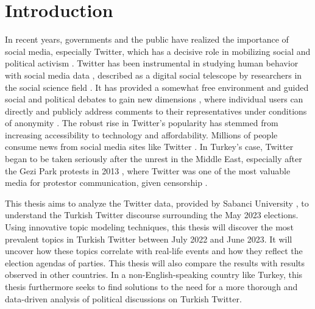 
\chapter{Introduction}\label{chapter:introduction}

In recent years, governments and the public have realized the importance of social media, 
especially Twitter, which has a decisive role in mobilizing social and political activism 
\parencite{uysal_turkeys_twitter_public_diplomacy_2019}. 
Twitter has been instrumental in studying human behavior with social media data 
\parencite{pfeffer_twitter_24_Hours_just_another_day_2023}, 
described as a digital social telescope by researchers in the social science field 
\parencite{mejova_twitter_2015_social_telescope}. 
It has provided a somewhat free environment and guided social and political debates to 
gain new dimensions \parencite{yerlikaya_social_media_manipulation_politics_2020}, 
where individual users can directly and publicly address comments to their representatives under 
conditions of anonymity \parencite{theocharis_twitter_political_incivility_2020}. The robust rise 
in Twitter's popularity has stemmed from increasing accessibility to technology and affordability. 
Millions of people consume news from social media sites like Twitter \parencite{anwar_analyzing_twitter_BERT_QAnon_2021}. 
In Turkey's case, Twitter began to be taken seriously after the unrest in the Middle East, 
especially after the Gezi Park protests in 2013 \parencite{zaharna_uysal_social_media_2016}, 
where Twitter was one of the most valuable media for protestor communication, given censorship 
\parencite{ogan__varol_twitter_gezi_park_2017}.


This thesis aims to analyze the Twitter data, provided by Sabanci University \parencite{secim2023},
to understand the Turkish Twitter discourse surrounding the May 2023 elections. Using innovative
topic modeling techniques, this thesis will discover the most prevalent topics in Turkish Twitter
between July 2022 and June 2023. It will uncover how these topics correlate with real-life events
and how they reflect the election agendas of parties. This thesis will also compare the results with 
results observed in other countries. In a non-English-speaking country like Turkey, this thesis 
furthermore seeks to find solutions to the need for a more thorough and data-driven 
analysis of political discussions on Turkish Twitter. 


